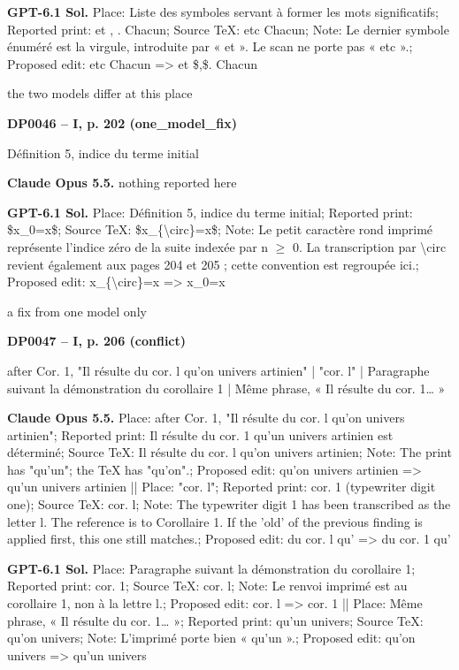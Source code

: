 \textbf{GPT-6.1 Sol.} Place: Liste des symboles servant à former les mots significatifs; Reported print: et , . Chacun; Source TeX: etc Chacun; Note: Le dernier symbole énuméré est la virgule, introduite par « et ». Le scan ne porte pas « etc ».; Proposed edit: etc Chacun =\allowbreak > et \$,\$. Chacun\par
the two models differ at this place\par
\par\noindent\hypertarget{DP0046}{}\textbf{DP0046 -- I, p. 202 (one\_model\_fix)}\par
Définition 5, indice du terme initial\par
\textbf{Claude Opus 5.5.} nothing reported here\par
\textbf{GPT-6.1 Sol.} Place: Définition 5, indice du terme initial; Reported print: \$x\_0=\allowbreak x\$; Source TeX: \$x\_\{\textbackslash{}circ\}=\allowbreak x\$; Note: Le petit caractère rond imprimé représente l'indice zéro de la suite indexée par n \ensuremath{\geq} 0. La transcription par \textbackslash{}circ revient également aux pages 204 et 205 ; cette convention est regroupée ici.; Proposed edit: x\_\{\textbackslash{}circ\}=\allowbreak x =\allowbreak > x\_0=\allowbreak x\par
a fix from one model only\par
\par\noindent\hypertarget{DP0047}{}\textbf{DP0047 -- I, p. 206 (conflict)}\par
after Cor. 1, "Il résulte du cor. l qu'on univers artinien" | "cor. l" | Paragraphe suivant la démonstration du corollaire 1 | Même phrase, « Il résulte du cor. 1… »\par
\textbf{Claude Opus 5.5.} Place: after Cor. 1, "Il résulte du cor. l qu'on univers artinien"; Reported print: Il résulte du cor. 1 qu'un univers artinien est déterminé; Source TeX: Il résulte du cor. l qu'on univers artinien; Note: The print has "qu'un"; the TeX has "qu'on".; Proposed edit: qu'on univers artinien =\allowbreak > qu'un univers artinien || Place: "cor. l"; Reported print: cor. 1 (typewriter digit one); Source TeX: cor. l; Note: The typewriter digit 1 has been transcribed as the letter l. The reference is to Corollaire 1. If the 'old' of the previous finding is applied first, this one still matches.; Proposed edit: du cor. l qu' =\allowbreak > du cor. 1 qu'\par
\textbf{GPT-6.1 Sol.} Place: Paragraphe suivant la démonstration du corollaire 1; Reported print: cor. 1; Source TeX: cor. l; Note: Le renvoi imprimé est au corollaire 1, non à la lettre l.; Proposed edit: cor. l =\allowbreak > cor. 1 || Place: Même phrase, « Il résulte du cor. 1… »; Reported print: qu'un univers; Source TeX: qu'on univers; Note: L'imprimé porte bien « qu'un ».; Proposed edit: qu'on univers =\allowbreak > qu'un univers\par
